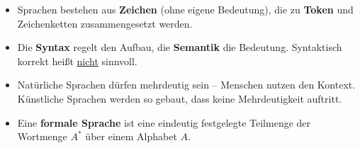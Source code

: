 \documentclass[11pt,a4paper]{article}
\newif\ifloesung
\newcommand{\lsgzeilen}[2]{%
  \vspace{6mm}
  \ifloesung{\small\color{lsgrot}#2\par}\else\linien{#1}\fi}
\begin{document}
\lsgzeilen{3}{a) $A_{\text{Hex}} = \{$\code{"\#"}, \code{"0"}, \ldots, \code{"9"}, \code{"A"}, \ldots, \code{"F"}$\}$ -- 17 Zeichen.\par
b) \textbf{Syntax}: ein \code{\#}, gefolgt von genau sechs Hexadezimalziffern. \textbf{Semantik}: je zwei Ziffern geben den Rot-, Grün- und Blauanteil als Zahl von \code{00} bis \code{FF} (0 bis 255) an -- hier R = 153, G = 0, B = 187.\par
c) z.\,B. \code{\#\#}, \code{9900BB} (ohne \code{\#}), \code{\#9900B} (nur fünf Ziffern) -- bildbar, aber nicht Teil der Sprache.\par
d) Die Bedeutung hängt hier an der \emph{Position}. Nur bei fester Länge ist die Zerlegung in drei Paare eindeutig; \code{\#00FF} ließe offen, welche Ziffern zu welchem Farbkanal gehören. Feste Stellenzahl sichert die eindeutige Semantik.}


\vspace{1mm}
\begin{merke}[Zusammenfassung]\small
\begin{itemize}\itemsep1pt
\item Sprachen bestehen aus \textbf{Zeichen} (ohne eigene Bedeutung), die zu \textbf{Token} und Zeichenketten zusammengesetzt werden.
\item Die \textbf{Syntax} regelt den Aufbau, die \textbf{Semantik} die Bedeutung. Syntaktisch korrekt heißt \underline{nicht} sinnvoll.
\item Natürliche Sprachen dürfen mehrdeutig sein -- Menschen nutzen den Kontext. Künstliche Sprachen werden so gebaut, dass keine Mehrdeutigkeit auftritt.
\item Eine \textbf{formale Sprache} ist eine eindeutig festgelegte Teilmenge der Wortmenge $A^{*}$ über einem Alphabet $A$.
\end{itemize}
\end{merke}
\end{document}
